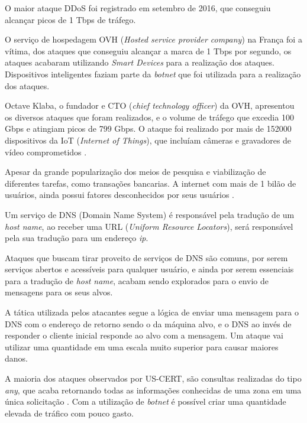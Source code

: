 O maior ataque DDoS foi registrado em setembro de 2016, que conseguiu alcançar picos de 1 Tbps de tráfego.

O serviço de hospedagem OVH (\textit{Hosted service provider company}) na França foi a vítima, dos ataques que conseguiu alcançar a marca de 1 Tbps por segundo, os ataques acabaram utilizando \textit{Smart Devices} para a realização dos ataques. Dispositivos inteligentes faziam parte da \textit{botnet} que foi utilizada para a realização dos ataques. 

Octave Klaba, o fundador e CTO (\textit{chief technology officer}) da OVH, apresentou os diversos ataques que foram realizados, e o volume de tráfego que excedia 100 Gbps e atingiam picos de 799 Gbps. O ataque foi realizado por mais de 152000 dispositivos da IoT (\textit{Internet of Things}), que incluíam câmeras e gravadores de vídeo comprometidos \cite{report:ddos}.


\iffalse 
Apesar da grande popularização dos meios de pesquisa e viabilização de diferentes tarefas, como transações bancarias. A internet com mais de 1 bilão de usuários, ainda possui fatores desconhecidos por seus usuários \cite{radware}. 

Um serviço de DNS (Domain Name System) é responsável pela tradução de um \textit{host name}, ao receber uma URL (\textit{Uniform Resource Locators}), será responsável pela sua tradução para um endereço \textit{ip}.


Ataques que buscam tirar proveito de serviços de DNS são comuns, por serem serviços abertos e acessíveis para qualquer usuário, e ainda por serem essenciais para a tradução de \textit{host name}, acabam sendo explorados para o envio de mensagens para os seus alvos. 

A tática utilizada pelos atacantes segue a lógica de enviar uma mensagem para o DNS com o endereço de retorno sendo o da máquina alvo, e o DNS ao invés de responder o cliente inicial responde ao alvo com a mensagem. Um ataque vai utilizar uma quantidade em uma escala muito superior para causar maiores danos.
 
A maioria dos ataques observados por US-CERT, são consultas realizadas do tipo \textit{any}, que acaba retornando todas as informações conhecidas de uma zona em uma única solicitação \cite{uscert}. Com a utilização de \textit{botnet} é possível criar uma quantidade elevada de tráfico com pouco gasto.


